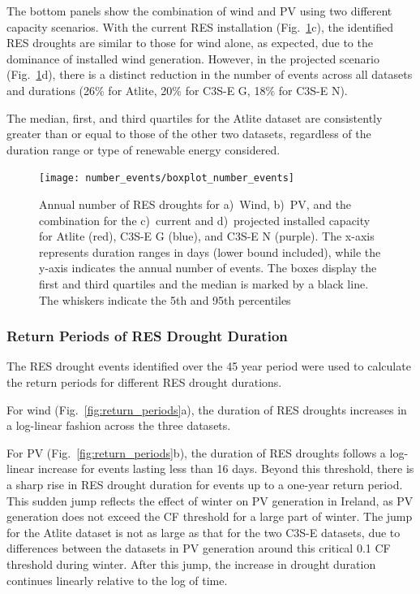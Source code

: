\documentclass[a4paper, 11pt]{article}
\begin{document}
The bottom panels show the combination of wind and PV using two different capacity scenarios. With the current RES installation (Fig.~\ref{fig:boxplot_number_events}c), the identified RES droughts are similar to those for wind alone, as expected, due to the dominance of installed wind generation. However, in the projected scenario (Fig.~\ref{fig:boxplot_number_events}d), there is a distinct reduction in the number of events across all datasets and durations (26\% for Atlite, 20\% for C3S-E G, 18\% for C3S-E N).

The median, first, and third quartiles for the Atlite dataset are consistently greater than or equal to those of the other two datasets, regardless of the duration range or type of renewable energy considered.

\begin{figure}[!ht]
	\centering
	\texttt{[image: number\_events/boxplot\_number\_events]}
	\caption{Annual number of RES droughts for a)~Wind, b)~PV, and the combination for the c)~current and d)~projected installed capacity for Atlite (red), C3S-E G (blue), and C3S-E N (purple). The x-axis represents duration ranges in days (lower bound included), while the y-axis indicates the annual number of events. The boxes display the first and third quartiles and the median is marked by a black line. The whiskers indicate the 5th and 95th percentiles}
	\label{fig:boxplot_number_events}	
\end{figure}

\newpage
\subsubsection{Return Periods of RES Drought Duration}

The RES drought events identified over the 45 year period were used to calculate the return periods for different RES drought durations.

For wind (Fig.~\ref{fig:return_periods}a), the duration of RES droughts increases in a log-linear fashion across the three datasets. 

For PV (Fig.~\ref{fig:return_periods}b), the duration of RES droughts follows a log-linear increase for events lasting less than 16 days. Beyond this threshold, there is a sharp rise in RES drought duration for events up to a one-year return period. This sudden jump reflects the effect of winter on PV generation in Ireland, as PV generation does not exceed the CF threshold for a large part of winter. The jump for the Atlite dataset is not as large as that for the two C3S-E datasets, due to differences between the datasets in PV generation around this critical 0.1 CF threshold during winter. After this jump, the increase in drought duration continues linearly relative to the log of time. 
\end{document}
